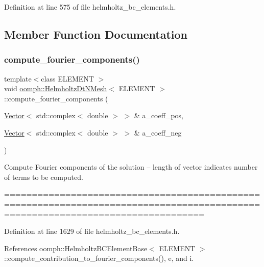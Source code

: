 Definition at line 575 of file helmholtz\+\_\+bc\+\_\+elements.\+h.



\subsection{Member Function Documentation}
\mbox{\label{classoomph_1_1HelmholtzDtNMesh_a7b3f84cb23c80fe71014d9079f925397}} 
\subsubsection{\texorpdfstring{compute\+\_\+fourier\+\_\+components()}{compute\_fourier\_components()}}
{\footnotesize\ttfamily template$<$class E\+L\+E\+M\+E\+NT $>$ \\
void \hyperlink{classoomph_1_1HelmholtzDtNMesh}{oomph\+::\+Helmholtz\+Dt\+N\+Mesh}$<$ E\+L\+E\+M\+E\+NT $>$\+::compute\+\_\+fourier\+\_\+components (\begin{DoxyParamCaption}\item[{\hyperlink{classoomph_1_1Vector}{Vector}$<$ std\+::complex$<$ double $>$ $>$ \&}]{a\+\_\+coeff\+\_\+pos,  }\item[{\hyperlink{classoomph_1_1Vector}{Vector}$<$ std\+::complex$<$ double $>$ $>$ \&}]{a\+\_\+coeff\+\_\+neg }\end{DoxyParamCaption})}



Compute Fourier components of the solution -- length of vector indicates number of terms to be computed. 

================================================================================================================================ 

Definition at line 1629 of file helmholtz\+\_\+bc\+\_\+elements.\+h.



References oomph\+::\+Helmholtz\+B\+C\+Element\+Base$<$ E\+L\+E\+M\+E\+N\+T $>$\+::compute\+\_\+contribution\+\_\+to\+\_\+fourier\+\_\+components(), e, and i.

\mbox{\label{classoomph_1_1HelmholtzDtNMesh_a93099b5a0811f5638f8dff7186c14dfb}} 
